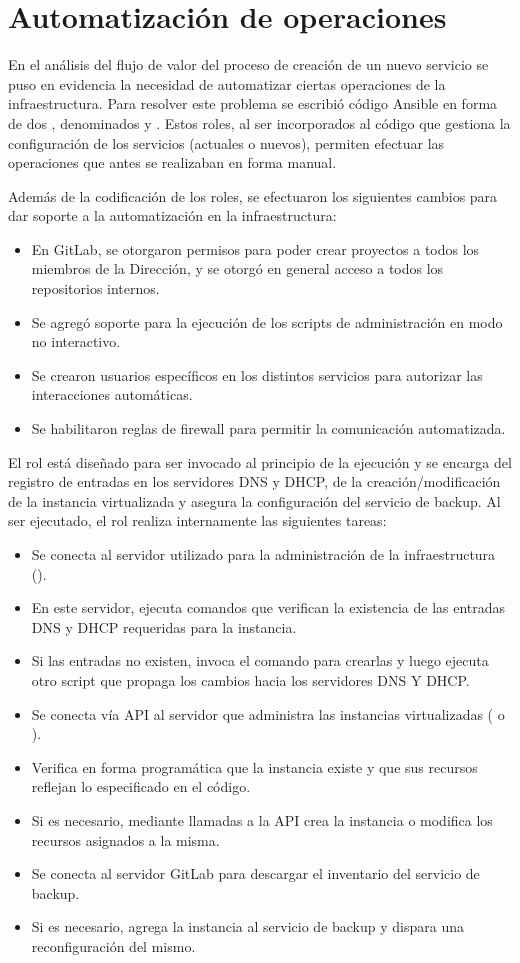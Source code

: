 %
%
\section{Automatización de operaciones}
%
En el análisis del flujo de valor del proceso de creación de un nuevo
servicio se puso en evidencia la necesidad de automatizar ciertas
operaciones de la infraestructura. Para resolver este problema se
escribió código Ansible en forma de dos , denominados
 y . Estos roles, al ser
incorporados al código que gestiona la configuración de los servicios
(actuales o nuevos), permiten efectuar las operaciones que antes se
realizaban en forma manual.

Además de la codificación de los roles, se efectuaron los siguientes
cambios para dar soporte a la automatización en la infraestructura:
%
\begin{itemize}
\item En GitLab, se otorgaron permisos para poder crear proyectos a
  todos los miembros de la Dirección, y se otorgó en general acceso a
  todos los repositorios internos.
\item Se agregó soporte para la ejecución de los scripts de
  administración en modo no interactivo.
\item Se crearon usuarios específicos en los distintos servicios para
  autorizar las interacciones automáticas.
\item Se habilitaron reglas de firewall para permitir la comunicación
  automatizada.
\end{itemize}
%
El rol  está diseñado para ser invocado al principio
de la ejecución y se encarga del registro de entradas en los
servidores DNS y DHCP, de la creación/modificación de la instancia
virtualizada y asegura la configuración del servicio de backup. Al ser
ejecutado, el rol realiza internamente las siguientes tareas:
%
\begin{itemize}
\item Se conecta al servidor utilizado para la administración de la
  infraestructura ().
\item En este servidor, ejecuta comandos que verifican la existencia
  de las entradas DNS y DHCP requeridas para la instancia.
\item Si las entradas no existen, invoca el comando para crearlas y
  luego ejecuta otro script que propaga los cambios hacia los
  servidores DNS Y DHCP.
\item Se conecta vía API al servidor que administra las instancias
  virtualizadas ( o ).
\item Verifica en forma programática que la instancia existe y que sus
  recursos reflejan lo especificado en el código.
\item Si es necesario, mediante llamadas a la API crea la instancia o
  modifica los recursos asignados a la misma.
\item Se conecta al servidor GitLab para descargar el inventario del
  servicio de backup.
\item Si es necesario, agrega la instancia al servicio de backup y
  dispara una reconfiguración del mismo.
\end{itemize}
